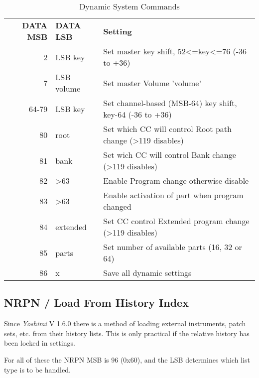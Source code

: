    \begin{table}[H]
      \centering
      \caption{Dynamic System Commands}
      \label{table:dynamic_system_commands}
      \begin{tabular}{r l l}

\textbf{DATA MSB} & \textbf{DATA LSB} & \textbf{Setting} \\

  2 & LSB key       & Set master key shift, 52\textless=key\textless=76 (-36 to +36) \\
  7 & LSB volume    & Set master Volume 'volume' \\
  64-79 & LSB key   & Set channel-based (MSB-64) key shift, key-64 (-36 to +36) \\
  80    & root      & Set which CC will control Root path change (\textgreater119 disables) \\
  81    & bank      & Set wich CC will control Bank change (\textgreater119 disables) \\
  82    & \textgreater63       & Enable Program change otherwise disable \\
  83    & \textgreater63       & Enable activation of part when program changed \\
  84    & extended  & Set CC control Extended program change (\textgreater119 disables) \\
  85    & parts     & Set number of available parts (16, 32 or 64) \\
  86    & x         & Save all dynamic settings \\
      \end{tabular}
   \end{table}

\subsection{NRPN / Load From History Index}
\label{subsection:nrpns_load_from_history_index}
   Since \textsl{Yoshimi} V 1.6.0 there is a method of loading external
   instruments, patch sets, etc. from their history lists. This is only
   practical if the relative history has been locked in settings.

   For all of these the NRPN MSB is 96 (0x60), and the LSB determines which
   list type is to be handled.

